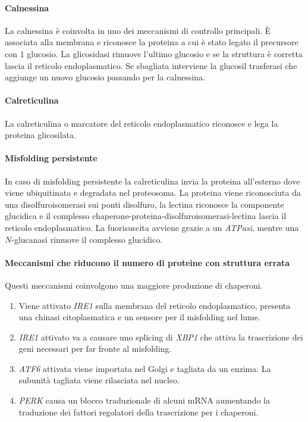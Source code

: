 			\paragraph{Calnessina}
			La calnessina \`e coinvolta in uno dei meccanismi di controllo principali.
			\`E associata alla membrana e riconosce la proteina a cui \`e stato legato il precursore con $1$ glucosio.
			La glicosidasi rimuove l'ultimo glucosio e se la struttura \`e corretta lascia il reticolo endoplasmatico.
			Se sbagliata interviene la glucosil trasferasi che aggiunge un nuovo glucosio passando per la calnessina.
			
			\paragraph{Calreticulina}
			La calreticulina o marcatore del reticolo endoplasmatico riconosce e lega la proteina glicosilata.
			
			\paragraph{Misfolding persistente}
			In caso di misfolding persistente la calreticulina invia la proteina all'esterno dove viene ubiquitinata e degradata nel proteosoma.
			La proteina viene riconosciuta da una disolfuroisomerasi sui ponti disolfuro, la lectina riconosce la componente glucidica e il complesso chaperone-proteina-disolfuroisomerasi-lectina lascia il reticolo endoplasmatico.
			La fuorisuscita avviene grazie a un \emph{ATPasi}, mentre una $N$-glucanasi rimuove il complesso glucidico.

			\paragraph{Meccanismi che riducono il numero di proteine con struttura errata}
			Questi meccanismi coinvolgono una maggiore produzione di chaperoni.
			\begin{multicols}{2}
				\begin{enumerate}
					\item Viene attivato \emph{IRE1} sulla membrana del reticolo endoplasmatico, presenta una chinasi citoplasmatica e un sensore per il misfolding nel lume.
					\item \emph{IRE1} attivato va a causare uno splicing di \emph{XBP1} che attiva la trascrizione dei geni necessari per far fronte al misfolding.
					\item \emph{ATF6} attivata viene importata nel Golgi e tagliata da un enzima.
						La subunit\`a tagliata viene rilasciata nel nucleo.
					\item \emph{PERK} causa un blocco traduzionale di alcuni mRNA aumentando la traduzione dei fattori regolatori della trascrizione per i chaperoni.
				\end{enumerate}
			\end{multicols}

